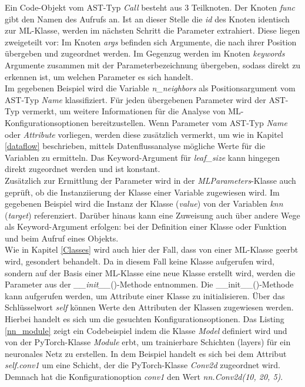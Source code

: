\documentclass[german,bachelor]{swsLeipzig}
\begin{document}
\noindent Ein Code-Objekt vom AST-Typ \textit{Call} besteht aus 3 Teilknoten.
Der Knoten \textit{func} gibt den Namen des Aufrufs an.
Ist an dieser Stelle die \textit{id} des Knoten identisch zur ML-Klasse, werden im nächsten Schritt die Parameter
extrahiert.
Diese liegen zweigeteilt vor:
Im Knoten \textit{args} befinden sich Argumente, die nach ihrer Position übergeben und zugeordnet werden.
Im Gegenzug werden im Knoten \textit{keywords} Argumente zusammen mit der Parameterbezeichnung übergeben, sodass direkt zu erkennen
ist, um welchen Parameter es sich handelt. \\
\indent Im gegebenen Beispiel wird die Variable \textit{n\_neighbors} als Positionsargument vom AST-Typ \textit{Name} klassifiziert.
Für jeden übergebenen Parameter wird der AST-Typ vermerkt, um weitere Informationen für die Analyse von ML-Konfigurationsoptionen
bereitzustellen.
Wenn Parameter vom AST-Typ \textit{Name} oder \textit{Attribute} vorliegen, werden diese zusätzlich vermerkt, um wie
in Kapitel \ref{dataflow} beschrieben, mittels Datenflussanalyse mögliche Werte für die Variablen zu ermitteln.
Das Keyword-Argument für \textit{leaf\_size} kann hingegen direkt zugeordnet werden und ist konstant. \\
\indent Zusätzlich zur Ermittlung der Parameter wird in der \textit{MLParameters}-Klasse auch geprüft, ob die Instanziierung der Klasse
einer Variable zugewiesen wird.
Im gegebenen Beispiel wird die Instanz der Klasse (\textit{value}) von der Variablen \textit{knn} (\textit{target}) referenziert.
Darüber hinaus kann eine Zuweisung auch über andere Wege als Keyword-Argument erfolgen:
bei der Definition einer Klasse oder Funktion und beim Aufruf eines Objekts.\\
\indent Wie in Kapitel \ref{Classes} wird auch hier der Fall, dass von einer ML-Klasse geerbt wird, gesondert behandelt.
Da in diesem Fall keine Klasse aufgerufen wird, sondern auf der Basis einer ML-Klasse eine neue Klasse erstellt wird, werden die Parameter aus der
\textit{\_\_init\_\_}()-Methode entnommen.
Die \_\_init\_\_()-Methode kann aufgerufen werden, um Attribute einer Klasse zu initialisieren.
Über das Schlüsselwort \textit{self} können Werte den Attributen der Klassen zugewiesen werden.
Hierbei handelt es sich um die gesuchten Konfigurationsoptionen.
Das Listing \ref{nn_module} zeigt ein Codebeispiel indem die Klasse \textit{Model} definiert wird und
von der PyTorch-Klasse \textit{Module} erbt, um trainierbare Schichten (layers) für ein neuronales Netz zu erstellen.
In dem Beispiel handelt es sich bei dem Attribut \textit{self.conv1} um eine Schicht, der die PyTorch-Klasse \textit{Conv2d}
zugeordnet wird.
Demnach hat die Konfigurationoption \textit{conv1} den Wert \textit{nn.Conv2d(10, 20, 5)}.\\
\end{document}
